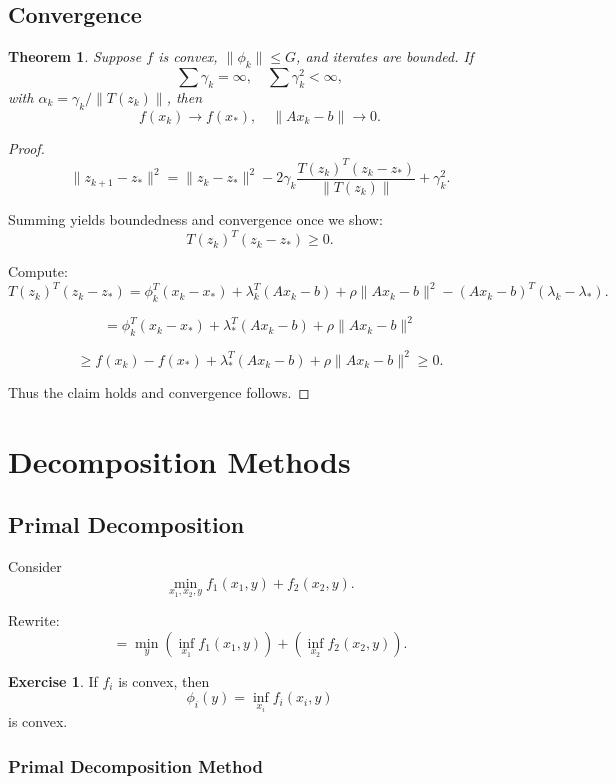 \documentclass[12pt,oneside]{book}
\numberwithin{equation}{section}
\theoremstyle{definition}
\newtheorem{exercise}{Exercise}[section]
\theoremstyle{plain}
\newtheorem{theorem}{Theorem}[section]
\theoremstyle{remark}
\begin{document}
\subsection*{Convergence}

\begin{theorem}
Suppose $f$ is convex, $\|\phi_k\|\le G$, and iterates are bounded.  
If
\[
\sum \gamma_k = \infty, \quad \sum \gamma_k^2 < \infty,
\]
with $\alpha_k = \gamma_k / \|T(z_k)\|$, then
\[
f(x_k) \to f(x_*), \quad \|Ax_k - b\| \to 0.
\]
\end{theorem}

\begin{proof}
\[
\|z_{k+1} - z_*\|^2
=
\|z_k - z_*\|^2
-2\gamma_k \frac{T(z_k)^T (z_k - z_*)}{\|T(z_k)\|}
+ \gamma_k^2.
\]

Summing yields boundedness and convergence once we show:
\[
T(z_k)^T (z_k - z_*) \ge 0.
\]

Compute:
\[
T(z_k)^T (z_k - z_*)
=
\phi_k^T(x_k-x_*)
+ \lambda_k^T(Ax_k-b)
+ \rho \|Ax_k-b\|^2
- (Ax_k-b)^T(\lambda_k-\lambda_*).
\]

\[
=
\phi_k^T(x_k-x_*)
+ \lambda_*^T(Ax_k-b)
+ \rho \|Ax_k-b\|^2
\]

\[
\ge f(x_k) - f(x_*) + \lambda_*^T(Ax_k-b) + \rho \|Ax_k-b\|^2
\ge 0.
\]

Thus the claim holds and convergence follows.
\end{proof}

\section{Decomposition Methods}

\subsection{Primal Decomposition}

Consider
\[
\min_{x_1,x_2,y} f_1(x_1,y) + f_2(x_2,y).
\]

Rewrite:
\[
=
\min_y \left( \inf_{x_1} f_1(x_1,y) \right)
+ \left( \inf_{x_2} f_2(x_2,y) \right).
\]

\begin{exercise}
If $f_i$ is convex, then
\[
\phi_i(y) = \inf_{x_i} f_i(x_i,y)
\]
is convex.
\end{exercise}

\subsubsection*{Primal Decomposition Method}
\end{document}
